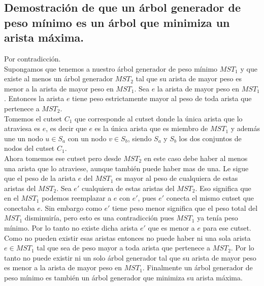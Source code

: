 \documentclass[12pt]{article}
\begin{document}
\subsection{Demostración de que un árbol generador de peso mínimo es un árbol que minimiza un arista máxima.}
Por contradicción.\\
Supongamos que tenemos a nuestro árbol generador de peso mínimo $MST_1$ y que existe al menos un árbol generador $MST_2$ tal que su arista de mayor peso es menor a la arista de mayor peso en $MST_1$. Sea $e$ la arista de mayor peso en $MST_1$. Entonces la arista $e$ tiene peso estrictamente mayor al peso de toda arista que pertenece a $MST_2$.\\
Tomemos el cutset $C_1$ que corresponde al cutset donde la única arista que lo atraviesa es $e$, es decir que $e$ es la única arista que es miembro de $MST_1$ y además une un nodo $u\in S_a$ con un nodo $v\in S_b$, siendo $S_a$ y $S_b$ los dos conjuntos de nodos del cutset $C_1$.\\
Ahora tomemos ese cutset pero desde $MST_2$ en este caso debe haber al menos una arista que lo atraviese, aunque también puede haber mas de una. Le sigue que el peso de la arista $e$ del $MST_1$ es mayor al peso de cualquiera de estas aristas del $MST_2$. Sea $e'$ cualquiera de estas aristas del $MST_2$. Eso significa que en el $MST_1$ podemos reemplazar a $e$ con $e'$, pues $e'$ conecta el mismo cutset que conectaba $e$. Sin embargo como $e'$ tiene peso menor significa que el peso total del $MST_1$ disminuiría, pero esto es una contradicción pues $MST_1$ ya tenía peso mínimo. Por lo tanto no existe dicha arista $e'$ que es menor a $e$ para ese cutset. Como no pueden existir esas aristas entonces no puede haber ni una sola arista $e\in MST_1$ tal que sea de peso mayor a toda arista que pertenece a $MST_2$. Por lo tanto no puede existir ni un solo árbol generador tal que su arista de mayor peso es menor a la arista de mayor peso en $MST_1$. Finalmente un árbol generador de peso mínimo es también un árbol generador que minimiza su arista máxima.
\end{document}
